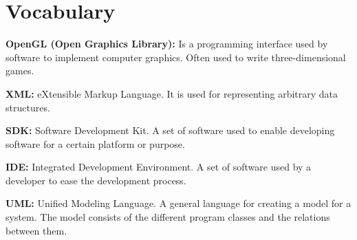 \section*{Vocabulary}

{\bf OpenGL (Open Graphics Library):} Is a programming interface used by software to implement computer graphics. Often used to write three-dimensional games.

{\bf XML:} eXtensible Markup Language. It is used for representing arbitrary data structures.

{\bf SDK:} Software Development Kit. A set of software used to enable developing software for a certain platform or purpose.

{\bf IDE:} Integrated Development Environment. A set of software used by a developer to ease the development process.

{\bf UML:} Unified Modeling Language. A general language for creating a model for a system. The model consists of the different program classes and the relations between them.